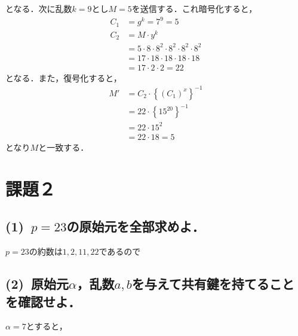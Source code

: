 \documentclass[a4paper,12pt]{jarticle}
\begin{document}
%
となる．次に乱数$k=9$とし$M=5$を送信する．これ暗号化すると，
%
\begin{align}
 C_1&=g^k =7^9=5\\
 C_2&=M \cdot y^k \nonumber\\
 &=5\cdot8 \cdot8^2 \cdot8^2 \cdot8^2 \cdot8^2 \nonumber\\
 &=17\cdot18 \cdot18 \cdot18 \cdot18 \nonumber\\
 &=17\cdot2 \cdot2 =22 
\end{align}
%
となる．また，復号化すると，
%
\begin{align}
 M'&=C_2\cdot \left\{ (C_1)^x \right\}^{-1} \nonumber\\
 &=22\cdot \left\{15^{20}\right\}^{-1} \nonumber\\
 &=22\cdot 15^2 \nonumber\\
 &=22\cdot18=5
\end{align}
%
となり$M$と一致する．
\vspace{-5mm}
\section*{課題２}
\vspace{-3mm}
\subsection*{(1)~$p=23$の原始元を全部求めよ．}
\vspace{-3mm}
$p=23$の約数は$1,2,11,22$であるので
\vspace{-6mm}
\subsection*{(2)~原始元$\alpha$，乱数$a,b$を与えて共有鍵を持てることを確認せよ．}
\vspace{-3mm}
$\alpha=7$とすると，
\end{document}
